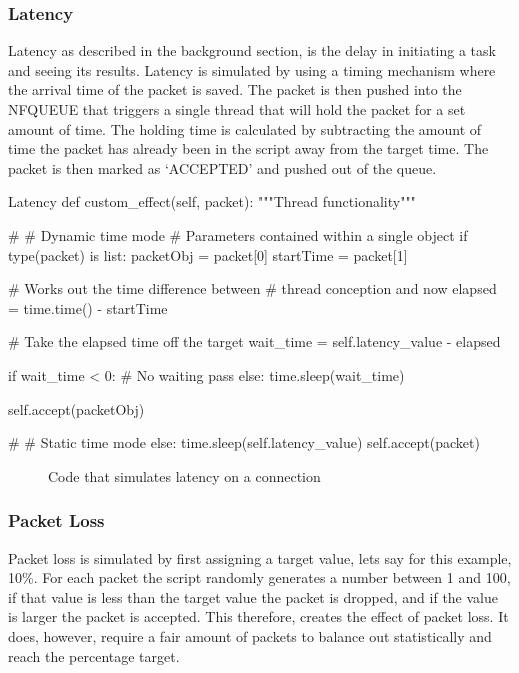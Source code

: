 \subsubsection{Latency}
Latency as described in the background section, is the delay in initiating a task and seeing its results. Latency is simulated by using a timing mechanism where the arrival time of the packet is saved. The packet is then pushed into the NFQUEUE that triggers a single thread that will hold the packet for a set amount of time. The holding time is calculated by subtracting the amount of time the packet has already been in the script away from the target time. The packet is then marked as `ACCEPTED' and pushed out of the queue.

\begin{Code}{Latency}
def custom_effect(self, packet):
	"""Thread functionality"""

	# # Dynamic time mode
	# Parameters contained within a single object
	if type(packet) is list:
		packetObj = packet[0]
		startTime = packet[1]

		# Works out the time difference between
		# thread conception and now
		elapsed = time.time() - startTime
            
		# Take the elapsed time off the target
		wait_time = self.latency_value - elapsed

		if wait_time < 0:
			# No waiting			
			pass
		else:
			time.sleep(wait_time)
			
		self.accept(packetObj)
			
	# # Static time mode
	else:
		time.sleep(self.latency_value)
		self.accept(packet)

\end{Code}
\begin{figure}[h]
	\caption{Code that simulates latency on a connection}
\end{figure}

\subsubsection{Packet Loss}
Packet loss is simulated by first assigning a target value, lets say for this example, 10\%. For each packet the script randomly generates a number between 1 and 100, if that value is less than the target value the packet is dropped, and if the value is larger the packet is accepted. This therefore, creates the effect of packet loss. It does, however, require a fair amount of packets to balance out statistically and reach the percentage target.

